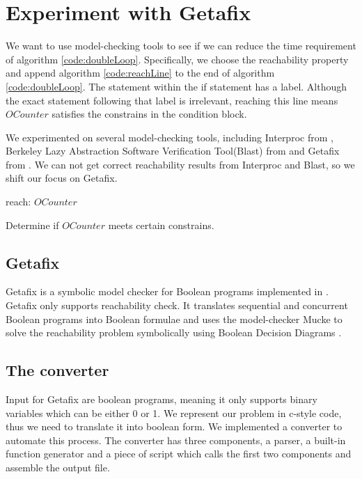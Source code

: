 \chapter{Experiment with Getafix}
	\label{CH_03}

We want to use model-checking tools to see if we can reduce the time requirement of algorithm \ref{code:doubleLoop}. Specifically, we choose the reachability property and append algorithm \ref{code:reachLine} to the end of algorithm \ref{code:doubleLoop}. The statement within the if statement has a label. Although the exact statement following that label is irrelevant, reaching this line means $OCounter$ satisfies the constrains in the condition block.

We experimented on several model-checking tools, including Interproc from \cite{_interproc_2011}, Berkeley Lazy Abstraction Software Verification Tool(Blast) from \cite{_mtc_2008} and Getafix from \cite{la_torre_analyzing_2009}. We can not get correct reachability results from Interproc and Blast, so we shift our focus on Getafix.

\renewcommand{\algorithmiccomment}[1]{// #1}
\begin{algorithm}
\begin{algorithmic}

\STATE reach: $OCounter$
\ENDIF

\end{algorithmic}

\caption[Single loop]{Determine if $OCounter$ meets certain constrains.}
\label{code:reachLine}
\end{algorithm}

\section{Getafix}
Getafix is a symbolic model checker for Boolean programs implemented in \cite{la_torre_analyzing_2009}. Getafix only supports reachability check. It translates sequential and concurrent Boolean programs into Boolean formulae and uses the model-checker Mucke to solve the reachability problem symbolically using Boolean Decision Diagrams \cite{_getafix_2009}. 

\section{The converter}
Input for Getafix are boolean programs, meaning it only supports binary variables which can be either 0 or 1. We represent our problem in c-style code, thus we need to translate it into boolean form. We implemented a converter to automate this process. The converter has three components, a parser, a built-in function generator and a piece of script which calls the first two components and assemble the output file.

